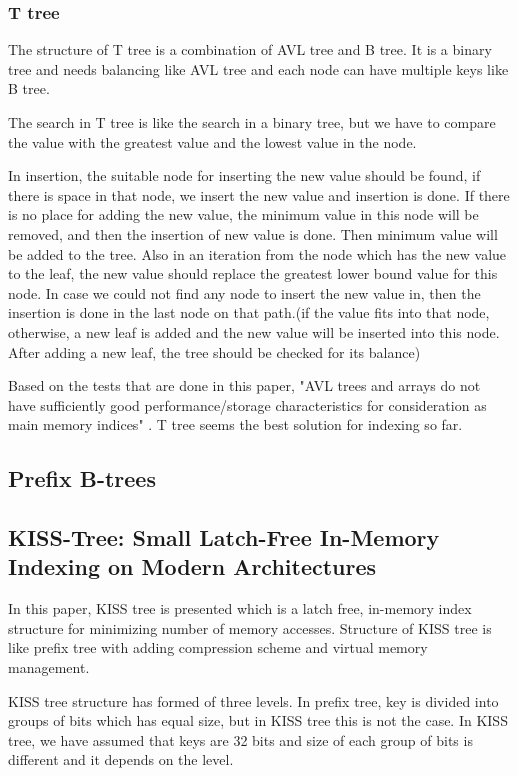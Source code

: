 \documentclass[12pt]{report}
\begin{document}
\subsubsection{T tree}

The structure of T tree is a combination of AVL tree and B tree. It is a binary tree and needs balancing like AVL tree and each node can have multiple keys like B tree.

The search in T tree is like the search in a binary tree, but we have to compare the value with the greatest value and the lowest value in the node.

 In insertion, the suitable node for inserting the new value should be found, if there is space in that node, we insert the new value and insertion is done. If there is no place for adding the new value, the minimum value in this node will be removed, and then the insertion of new value is done. Then minimum value will be added to the tree. Also in an iteration from the node which has the new value to the leaf, the new value should replace the greatest lower bound value for this node. In case we could not find any node to insert the new value in, then the insertion is done in the last node on that path.(if the value fits into that node, otherwise, a new leaf is added and the new value will be inserted into this node. After adding a new leaf, the tree should be checked for its balance)
 
Based on the tests that are done in this paper, "AVL trees and arrays do not have sufficiently good performance/storage characteristics for consideration as main memory indices" \cite{leca}. T tree seems the best solution for indexing so far. 

\subsection{Prefix B-trees \cite{R.Bayer} }


\subsection{KISS-Tree: Small Latch-Free In-Memory Indexing on Modern Architectures \cite{Kissinger} }

In this paper, KISS tree is presented which is a latch free, in-memory index structure for minimizing number of memory accesses. Structure of KISS tree is like prefix tree with adding compression scheme and virtual memory management.

KISS tree structure has formed of three levels. In prefix tree, key is divided into groups of bits which has equal size, but in KISS tree this is not the case. In KISS tree, we have assumed that keys are 32 bits and size of each group of bits is different and it depends on the level.
\end{document}
